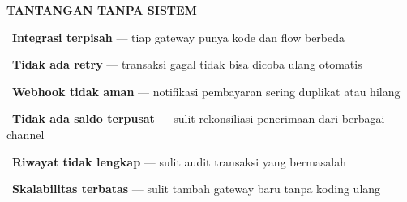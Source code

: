 \documentclass[a4paper]{article}
\begin{document}
\noindent
\begin{minipage}[t]{0.485\textwidth}
    \colorbox{RedLight}{%
        \begin{minipage}{\dimexpr\textwidth-2\fboxsep\relax}
            {\fontsize{10}{13}\selectfont\bfseries\color{RedText} TANTANGAN TANPA SISTEM}
        \end{minipage}}\par
    \vspace{4pt}

    {\fontsize{9.5}{13}\selectfont\color{TextDark}%
    \textbullet\ \textbf{Integrasi terpisah} --- tiap gateway punya kode dan flow berbeda\par\vspace{4pt}%
    \textbullet\ \textbf{Tidak ada retry} --- transaksi gagal tidak bisa dicoba ulang otomatis\par\vspace{4pt}%
    \textbullet\ \textbf{Webhook tidak aman} --- notifikasi pembayaran sering duplikat atau hilang\par\vspace{4pt}%
    \textbullet\ \textbf{Tidak ada saldo terpusat} --- sulit rekonsiliasi penerimaan dari berbagai channel\par\vspace{4pt}%
    \textbullet\ \textbf{Riwayat tidak lengkap} --- sulit audit transaksi yang bermasalah\par\vspace{4pt}%
    \textbullet\ \textbf{Skalabilitas terbatas} --- sulit tambah gateway baru tanpa koding ulang}%
\end{minipage}%
\hfill%
\end{document}
